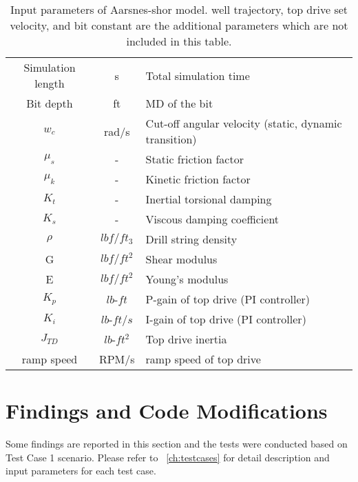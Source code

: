 \begin{table}[!hbt]
\centering
\begin{tabularx}{\linewidth-0.75in}{|c|c|L|}
\hline
{} &  &  \\                                                              
\hline
Simulation length & s & Total simulation time \\                                                  
\hline
Bit depth & ft & MD of the bit \\                                                   
\hline
$w_c$ & rad/s & Cut-off angular velocity (static, dynamic transition)\\                                                              
\hline
$\mu_s$ & -& Static friction factor\\
\hline
$\mu_k$ & - & Kinetic friction factor \\ 
\hline
$K_t$ &- & Inertial torsional damping \\                                                  
\hline
$K_s$ &- & Viscous damping coefficient \\                                                   
\hline
$\rho$ & $lbf/ft_3$ & Drill string density \\                                                       
\hline
G & $lbf/ft^2$ & Shear modulus   \\                                                         
\hline
E & $lbf/ft^2$ & Young's modulus \\                                                              
\hline
$K_p$ & $lb$-$ft$ & P-gain of top drive (PI controller) \\
\hline
$K_i$ & $lb$-$ft/s$ &I-gain of top drive (PI controller)\\ 
\hline
$J_{TD}$ & $lb$-$ft^2$ & Top drive inertia \\
\hline
ramp speed & RPM/s & ramp speed of top drive\\
\hline
\end{tabularx}
\caption[Input parameters of Aarsnes-Shor model (PYTHON ver.)]{Input parameters of Aarsnes-shor model. well trajectory, top drive set velocity, and bit constant are the additional parameters which are not included in this table.}\label{AS_inptut_params}
\end{table}

\section{Findings and Code Modifications}
Some findings are reported in this section and the tests were conducted based on Test Case 1 scenario. Please refer to \chaptername~\ref{ch:testcases} for detail description and input parameters for each test case.

